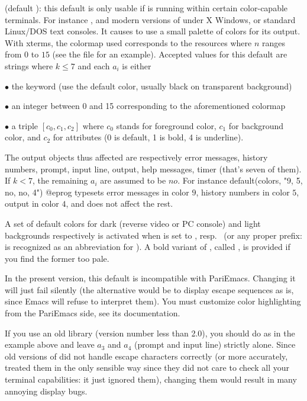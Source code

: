  (default ): this default is only usable if
\label{se:colors}
is running within certain color-capable terminals. For instance ,
 and modern versions of  under X Windows, or
standard Linux/DOS text consoles. It causes  to use a small palette of
colors for its output. With xterms, the colormap used corresponds to the
resources  where $n$ ranges from $0$ to $15$ (see the
file  for an example). Accepted values for this
default are strings  where $k\le7$ and each
$a_i$ is either

\noindent $\bullet$ the keyword  (use the default color, usually
black on transparent background)

\noindent $\bullet$ an integer between 0 and 15 corresponding to the
aforementioned colormap

\noindent $\bullet$ a triple $[c_0,c_1,c_2]$ where $c_0$ stands for foreground
color, $c_1$ for background color, and $c_2$ for attributes (0 is default, 1
is bold, 4 is underline).

The output objects thus affected are respectively error messages,
history numbers, prompt, input line, output, help messages, timer (that's
seven of them). If $k < 7$, the remaining $a_i$ are assumed to be $no$. For
instance
%
\bprog
default(colors, "9, 5, no, no, 4")
@eprog
\noindent
typesets error messages in color $9$, history numbers in color $5$, output in
color $4$, and does not affect the rest.

A set of default colors for dark (reverse video or PC console) and light
backgrounds respectively is activated when  is set to
, resp.~ (or any proper prefix:  is
recognized as an abbreviation for ). A bold variant of
, called , is provided if you find the former too
pale.

\emacs In the present version, this default is incompatible with PariEmacs.
Changing it will just fail silently (the alternative would be to display
escape sequences as is, since Emacs will refuse to interpret them).
You must customize color highlighting from the PariEmacs side, see its
documentation.

If you use an old  library (version number less than 2.0),
you should do as in the example above and leave $a_3$ and $a_4$ (prompt
and input line) strictly alone. Since old versions of  did
not handle escape characters correctly (or more accurately, treated them
in the only sensible way since they did not care to check all your terminal
capabilities: it just ignored them), changing them would result in many
annoying display bugs.


